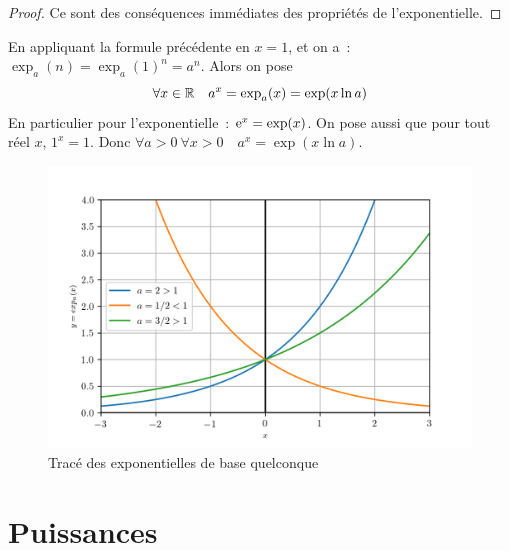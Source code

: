 \begin{proof}
  Ce sont des conséquences immédiates des propriétés de l'exponentielle.
\end{proof}
%
En appliquant la formule précédente en \(x=1\), et on a~: \(\exp_a(n)=\exp_a(1)^n=a^n\). Alors on pose
\begin{equation}
  \forall x \in \mathbb{R} \quad a^x=\exp_a(x)=\exp(x \ln a)
\end{equation}
En particulier pour l'exponentielle~: \(\operatorname{e}^x=\exp(x)\). On pose aussi que pour tout réel \(x\), \(1^x=1\). Donc \(\forall a>0 \ \forall x>0 \quad a^x=\exp(x \ln a)\).
%
\begin{figure}
  \centering
  \includegraphics[scale=0.6]{expa.png}
  \caption{Tracé des exponentielles de base quelconque}
  \label{fig:traceexpa}
\end{figure}
%
\section{Puissances}
\label{sec:chap1-puissances}
